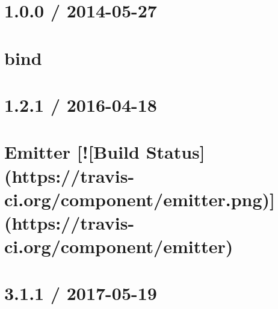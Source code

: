 \documentclass[twoside]{book}
\newcommand{\+}{\discretionary{\mbox{\scriptsize$\hookleftarrow$}}{}{}}
\begin{document}
\chapter{1.0.0 / 2014-\/05-\/27}
\label{md_bin_node_modules_socket_8io_node_modules_socket_8io-client_node_modules_component-bind__history}

\chapter{bind}
\label{md_bin_node_modules_socket_8io_node_modules_socket_8io-client_node_modules_component-bind__readme}

\chapter{1.2.1 / 2016-\/04-\/18}
\label{md_bin_node_modules_socket_8io_node_modules_socket_8io-client_node_modules_component-emitter__history}

\chapter{Emitter \mbox{[}!\mbox{[}Build Status\mbox{]}(https\+://travis-\/ci.org/component/emitter.png)\mbox{]}(https\+://travis-\/ci.org/component/emitter)}
\label{md_bin_node_modules_socket_8io_node_modules_socket_8io-client_node_modules_component-emitter__readme}

\chapter{3.1.1 / 2017-\/05-\/19}
\label{md_bin_node_modules_socket_8io_node_modules_socket_8io-client_node_modules_engine_8io-client__history}

\end{document}
